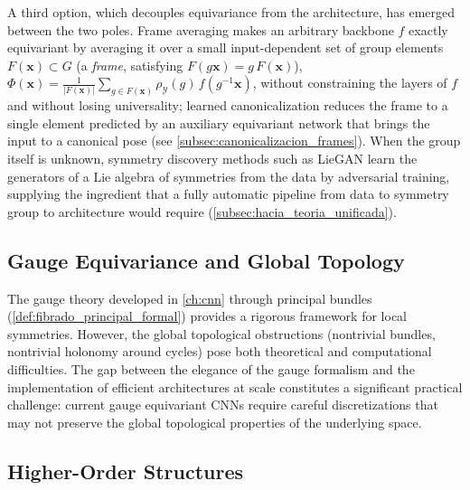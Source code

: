 A third option, which decouples equivariance from the architecture, has emerged between the two poles. Frame averaging \citep{puny2022frameaveraging} makes an arbitrary backbone $f$ exactly equivariant by averaging it over a small input-dependent set of group elements $F(\mathbf{x}) \subset G$ (a \textit{frame}, satisfying $F(g\mathbf{x}) = g\,F(\mathbf{x})$), $\Phi(\mathbf{x}) = \frac{1}{|F(\mathbf{x})|}\sum_{g \in F(\mathbf{x})} \rho_{\mathcal{Y}}(g)\, f(g^{-1}\mathbf{x})$, without constraining the layers of $f$ and without losing universality; learned canonicalization \citep{kaba2023canonicalization} reduces the frame to a single element predicted by an auxiliary equivariant network that brings the input to a canonical pose (see \autoref{subsec:canonicalizacion_frames}). When the group itself is unknown, symmetry discovery methods such as LieGAN \citep{yang2023liegan} learn the generators of a Lie algebra of symmetries from the data by adversarial training, supplying the ingredient that a fully automatic pipeline from data to symmetry group to architecture would require (\autoref{subsec:hacia_teoria_unificada}).

\subsection{Gauge Equivariance and Global Topology}

The gauge theory developed in \autoref{ch:cnn} through principal bundles (\autoref{def:fibrado_principal_formal}) provides a rigorous framework for local symmetries. However, the global topological obstructions (nontrivial bundles, nontrivial holonomy around cycles) pose both theoretical and computational difficulties. The gap between the elegance of the gauge formalism and the implementation of efficient architectures at scale constitutes a significant practical challenge: current gauge equivariant \glspl{CNN} require careful discretizations that may not preserve the global topological properties of the underlying space.

\subsection{Higher-Order Structures}

